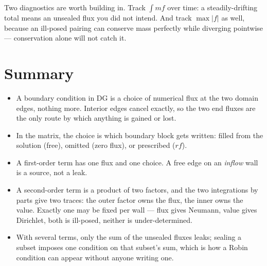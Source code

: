 \documentclass[11pt]{article}
\begin{document}
Two diagnostics are worth building in. Track $\int m f$ over time: a
steadily-drifting total means an unsealed flux you did not intend. And track
$\max|f|$ as well, because an ill-posed pairing can conserve mass perfectly
while diverging pointwise --- conservation alone will not catch it.

\section{Summary}

\begin{itemize}\itemsep2pt
\item A boundary condition in DG is a choice of numerical flux at the two domain
      edges, nothing more. Interior edges cancel exactly, so the two end fluxes
      are the only route by which anything is gained or lost.
\item In the matrix, the choice is which boundary block gets written: filled
      from the solution (free), omitted (zero flux), or prescribed ($rf$).
\item A first-order term has one flux and one choice. A free edge on an
      \emph{inflow} wall is a source, not a leak.
\item A second-order term is a product of two factors, and the two integrations
      by parts give two traces: the outer factor owns the flux, the inner owns
      the value. Exactly one may be fixed per wall --- flux gives Neumann, value
      gives Dirichlet, both is ill-posed, neither is under-determined.
\item With several terms, only the sum of the unsealed fluxes leaks; sealing a
      subset imposes one condition on that subset's sum, which is how a Robin
      condition can appear without anyone writing one.
\end{itemize}
\end{document}
